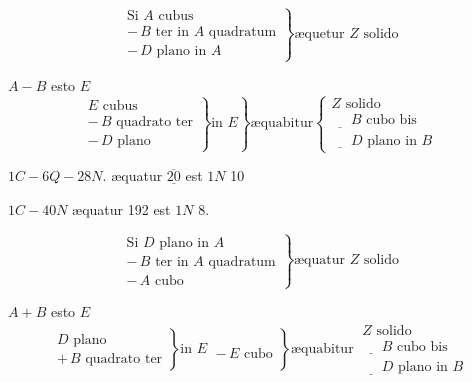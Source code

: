 \documentclass[11pt,a4paper]{article}
\begin{document}
\[ \left. \begin{array}{l} \text{Si } A \text{ cubus} \\ -\,B \text{ ter in } A \text{ quadratum} \\ -\,D \text{ plano in } A \end{array} \right\} \text{æquetur } Z \text{ solido} \]

$A - B$ esto $E$
\[ \left. \left. \begin{array}{l} E \text{ cubus} \\ -\,B \text{ quadrato ter} \\ -\,D \text{ plano} \end{array} \right\} \text{in } E \right\} \text{æquabitur} \left\{ \begin{array}{l} Z \text{ solido} \\ \underline{\phantom{+}}\,B \text{ cubo bis} \\ \underline{\phantom{+}}\,D \text{ plano in } B \end{array} \right. \]
\marginal{$\overline{\underline{+}}$ \quad $\overline{\underline{+}}$}

$1C - 6Q - 28N$. æquatur $\underline{\overline{20}}$ est $1N$ 10

$1C - 40N$ æquatur 192 est $1N$ 8.

\[ \left. \begin{array}{l} \text{Si } D \text{ plano in } A \\ -\,B \text{ ter in } A \text{ quadratum} \\ -\,A \text{ cubo} \end{array} \right\} \text{æquatur } Z \text{ solido} \]

$A + B$ esto $E$
\[ \left. \left. \begin{array}{l} D \text{ plano} \\ +\,B \text{ quadrato ter} \end{array} \right\} \text{in } E \ \begin{array}{l} \\ -\,E \text{ cubo} \end{array} \right\} \text{æquabitur} \ \begin{array}{l} Z \text{ solido} \\ \underline{\phantom{+}}\,B \text{ cubo bis} \\ \underline{\phantom{+}}\,D \text{ plano in } B \end{array} \]
\marginal{$\overline{\underline{+}}$ \quad $\overline{\underline{+}}$}
\end{document}
